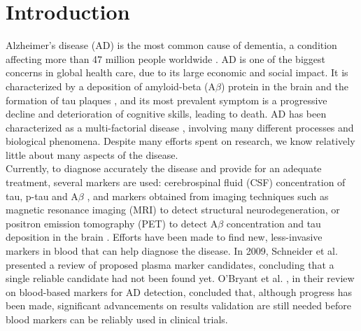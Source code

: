 
\section{Introduction}
Alzheimer's disease (AD) is the most common cause of dementia, a condition affecting more than 47 million people worldwide \cite{AlzheimersAssociation}. AD is one of the biggest concerns in global health care, due to its large economic and social impact. It is characterized by a deposition of amyloid-beta (A$\beta$) protein in the brain and the formation of tau plaques \cite{Jack2018}, and its most prevalent symptom is a progressive decline and deterioration of cognitive skills, leading to death. AD has been characterized as a multi-factorial disease \cite{Jack2013,Jack2018}, involving many different processes and biological phenomena. Despite many efforts spent on research, we know relatively little about many aspects of the disease. \\

Currently, to diagnose accurately the disease and provide for an adequate treatment, several markers are used: cerebrospinal fluid (CSF) concentration of tau, p-tau and A$\beta$ \cite{Andreasen1999}, and markers obtained from imaging techniques such as magnetic resonance imaging (MRI) to detect structural neurodegeneration, or positron emission tomography (PET) to detect A$\beta$ concentration and tau deposition in the brain \cite{Weiner2005,Clark2011}. Efforts have been made to find new, less-invasive markers in blood that can help diagnose the disease. In 2009, Schneider et al. \cite{Schneider2009} presented a review of proposed plasma marker candidates, concluding that a single reliable candidate had not been found yet. O'Bryant et al. \cite{Obryant}, in their review on blood-based markers for AD detection, concluded that, although progress has been made, significant advancements on results validation are still needed before blood markers can be reliably used in clinical trials. \\

